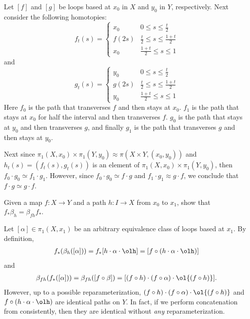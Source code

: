 \begin{homework}[e]
\begin{prf}
    Let $[f]$ and $[g]$ be loops based at $x_0$ in $X$ and $y_0$ in $Y$, respectively. Next consider the following homotopies:
    \begin{equation*}f_t(s) = 
        \begin{cases}
            x_0 & 0 \leq s \leq \frac{t}{2} \\
            f(2s) & \frac{t}{2} \leq s \leq \frac{1+t}{2} \\
            x_0 & \frac{1 + t}{2} \leq s \leq 1
        \end{cases}
    \end{equation*}
    and 
    \begin{equation*}g_t(s) = 
        \begin{cases}
            y_0 & 0 \leq s \leq \frac{t}{2} \\
            g(2s) & \frac{t}{2} \leq s \leq \frac{1+t}{2} \\
            y_0 & \frac{1 + t}{2} \leq s \leq 1
        \end{cases}
    \end{equation*}
Here $f_0$ is the path that transverses $f$ and then stays at $x_0$. $f_1$ is the path that stays at $x_0$ for half the interval and then transverses $f$. $g_0$ is the path that stays at $y_0$ and then transverses $g$, and finally $g_1$ is the path that transverses $g$ and then stays at $y_0$.

Next since $\pi_1(X,x_0) \times \pi_1(Y,y_0) \approx \pi(X \times Y, (x_0,y_0))$ and $h_t(s) = (f_t(s),g_t(s))$ is an element of $\pi_1(X,x_0) \times \pi_1(Y,y_0)$, then $f_0 \cdot g_0 \simeq f_1 \cdot g_1$. However, since $f_0 \cdot g_0 \simeq f \cdot g$ and $f_1 \cdot g_1 \approx g \cdot f$, we conclude that $f\cdot g \simeq g\cdot f$.
\end{prf}

 Given a map $f:X\to Y$ and a path $h:I\to X$ from $x_0$ to $x_1$, show that $f_*\beta_h = \beta_{fh}f_*$.
\begin{prf}
    Let $[\alpha] \in \pi_1(X,x_1)$ be an arbitrary equivalence class of loops based at $x_1$. By definition,
    \begin{align*}
        f_*(\beta_h([\alpha])) = f_*[h\cdot \alpha \cdot \olh] = [f\circ (h\cdot \alpha \cdot \olh)]
    \end{align*}
    and 
    \begin{align*}
        \beta_{fh}(f_*([\alpha])) = \beta_{fh}([f\circ \beta]) = [(f\circ h)\cdot (f\circ \alpha)\cdot \ol{(f\circ h)}].
    \end{align*}
    However, up to a possible reparameterization, $(f\circ h)\cdot (f\circ \alpha)\cdot \ol{(f\circ h)}$ and $f\circ (h\cdot \alpha \cdot \olh)$ are identical paths on $Y$. In fact, if we perform concatenation from consistently, then they are identical without \emph{any} reparameterization.
    

\end{prf}
\end{homework}
